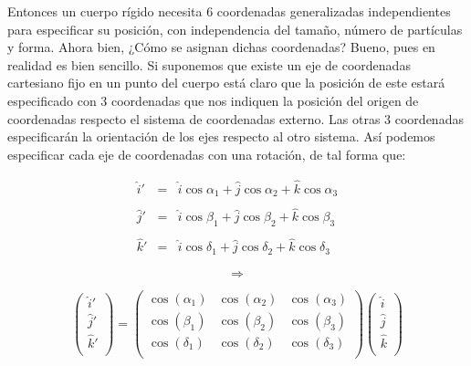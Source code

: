 \documentclass[12pt,a4paper]{book}
\begin{document}
Entonces un cuerpo rígido necesita 6 coordenadas generalizadas independientes para especificar su posición, con independencia del tamaño, número de partículas y forma. Ahora bien, ¿Cómo se asignan dichas coordenadas? Bueno, pues en realidad es bien sencillo. Si suponemos que existe un eje de coordenadas cartesiano fijo en un punto del cuerpo está claro que la posición de este estará especificado con 3 coordenadas que nos indiquen la posición del origen de coordenadas respecto el sistema de coordenadas externo. Las otras 3 coordenadas especificarán la orientación de los ejes respecto al otro sistema.  Así podemos especificar cada eje de coordenadas con una rotación, de tal forma que:

\begin{equation}
\begin{array}{lll}
\widehat{i} ' & = & \widehat{i} \cos  \alpha_1 + \widehat{j} \cos  \alpha_2 + \widehat{k} \cos \alpha_3 \\ \\
\widehat{j} ' & = & \widehat{i} \cos  \beta_1 + \widehat{j} \cos  \beta_2 + \widehat{k} \cos \beta_3 \\ \\
\widehat{k} ' & = & \widehat{i} \cos  \delta_1 + \widehat{j} \cos  \delta_2 + \widehat{k} \cos \delta_3
\end{array}
\end{equation} 

$$ \Longrightarrow $$

\begin{equation}
\begin{pmatrix}
\widehat{i}' \\
\widehat{j}' \\
\widehat{k}' \\
\end{pmatrix}
=
\begin{pmatrix}\cos(\alpha_{1}) &
\cos(\alpha_{2}) &
\cos(\alpha_{3}) \\ 
\cos(\beta_{1}) &
\cos(\beta_{2}) &
\cos(\beta_{3}) \\ 
\cos(\delta_{1}) &
\cos(\delta_{2}) &
\cos(\delta_{3}) \\ 
\end{pmatrix}
\begin{pmatrix}
\widehat{i} \\
\widehat{j} \\
\widehat{k} \\
\end{pmatrix}
\end{equation}
\end{document}
